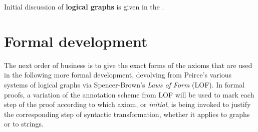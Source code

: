 \documentclass[12pt]{article}
\begin{document}

Initial discussion of \textbf{logical graphs} is given in the .

\tableofcontents

\section{Formal development}

The next order of business is to give the exact forms of the axioms that are used in the following more formal development, devolving from Peirce's various systems of logical graphs via Spencer-Brown's \textit{Laws of Form} (LOF).  In formal proofs, a variation of the annotation scheme from LOF will be used to mark each step of the proof according to which axiom, or \textit{initial}, is being invoked to justify the corresponding step of syntactic transformation, whether it applies to graphs or to strings.
\end{document}
